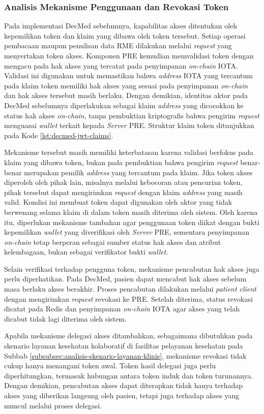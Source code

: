 \subsubsection{Analisis Mekanisme Penggunaan dan Revokasi Token}
\label{subsubsec:analisis-mekanisme-penggunaan-dan-revokasi-akses}

Pada implementasi DecMed sebelumnya, kapabilitas akses ditentukan oleh kepemilikan token dan klaim yang dibawa oleh token tersebut. Setiap operasi pembacaan maupun penulisan data RME dilakukan melalui \textit{request} yang menyertakan token akses. Komponen PRE kemudian memvalidasi token dengan mengacu pada hak akses yang tercatat pada penyimpanan \textit{on-chain} IOTA. Validasi ini digunakan untuk memastikan bahwa \textit{address} IOTA yang tercantum pada klaim token memiliki hak akses yang sesuai pada penyimpanan \textit{on-chain} dan hak akses tersebut masih berlaku. Dengan demikian, identitas aktor pada DecMed sebelumnya diperlakukan sebagai klaim \textit{address} yang dicocokkan ke status hak akses \textit{on-chain}, tanpa pembuktian kriptografis bahwa pengirim \textit{request} menguasai \textit{wallet} terkait kepada \textit{Server} PRE. Struktur klaim token ditunjukkan pada Kode \ref{lst:decmed-jwt-claims}.

Mekanisme tersebut masih memiliki keterbatasan karena validasi berfokus pada klaim yang dibawa token, bukan pada pembuktian bahwa pengirim \textit{request} benar-benar merupakan pemilik \textit{address} yang tercantum pada klaim. Jika token akses diperoleh oleh pihak lain, misalnya melalui kebocoran atau pencurian token, pihak tersebut dapat mengirimkan \textit{request} dengan klaim \textit{address} yang masih valid. Kondisi ini membuat token dapat digunakan oleh aktor yang tidak berwenang selama klaim di dalam token masih diterima oleh sistem. Oleh karena itu, diperlukan mekanisme tambahan agar penggunaan token diikat dengan bukti kepemilikan \textit{wallet} yang diverifikasi oleh \textit{Server} PRE, sementara penyimpanan \textit{on-chain} tetap berperan sebagai sumber status hak akses dan atribut kelembagaan, bukan sebagai verifikator bukti \textit{wallet}.

Selain verifikasi terhadap pengguna token, mekanisme pencabutan hak akses juga perlu diperhatikan. Pada DecMed, pasien dapat mencabut hak akses sebelum masa berlaku akses berakhir. Proses pencabutan dilakukan melalui \textit{patient client} dengan mengirimkan \textit{request} revokasi ke PRE. Setelah diterima, status revokasi dicatat pada Redis dan penyimpanan \textit{on-chain} IOTA agar akses yang telah dicabut tidak lagi diterima oleh sistem.

Apabila mekanisme delegasi akses ditambahkan, sebagaimana dibutuhkan pada skenario layanan kesehatan kolaboratif di fasilitas pelayanan kesehatan pada Subbab \ref{subsubsec:analisis-skenario-layanan-klinis}, mekanisme revokasi tidak cukup hanya menangani token awal. Token hasil delegasi juga perlu diperhitungkan, termasuk hubungan antara token induk dan token turunannya. Dengan demikian, pencabutan akses dapat diterapkan tidak hanya terhadap akses yang diberikan langsung oleh pasien, tetapi juga terhadap akses yang muncul melalui proses delegasi.
